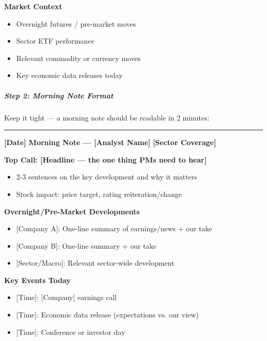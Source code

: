 \documentclass[11pt]{article}
\begin{document}
\textbf{Market Context}

\begin{itemize}[leftmargin=*,itemsep=2pt,topsep=2pt]
\item {} Overnight futures / pre-market moves
\item {} Sector ETF performance
\item {} Relevant commodity or currency moves
\item {} Key economic data releases today
\end{itemize}

\subparagraph{Step 2: Morning Note Format}\mbox{}\par

Keep it tight — a morning note should be readable in 2 minutes:


\vspace{0.5em}\hrule\vspace{0.5em}

\textbf{[Date] Morning Note — [Analyst Name]} \textbf{[Sector Coverage]}


\textbf{Top Call: [Headline — the one thing PMs need to hear]}

\begin{itemize}[leftmargin=*,itemsep=2pt,topsep=2pt]
\item {} 2-3 sentences on the key development and why it matters
\item {} Stock impact: price target, rating reiteration/change
\end{itemize}

\textbf{Overnight/Pre-Market Developments}

\begin{itemize}[leftmargin=*,itemsep=2pt,topsep=2pt]
\item {} [Company A]: One-line summary of earnings/news + our take
\item {} [Company B]: One-line summary + our take
\item {} [Sector/Macro]: Relevant sector-wide development
\end{itemize}

\textbf{Key Events Today}

\begin{itemize}[leftmargin=*,itemsep=2pt,topsep=2pt]
\item {} [Time]: [Company] earnings call
\item {} [Time]: Economic data release (expectations vs. our view)
\item {} [Time]: Conference or investor day
\end{itemize}
\end{document}
